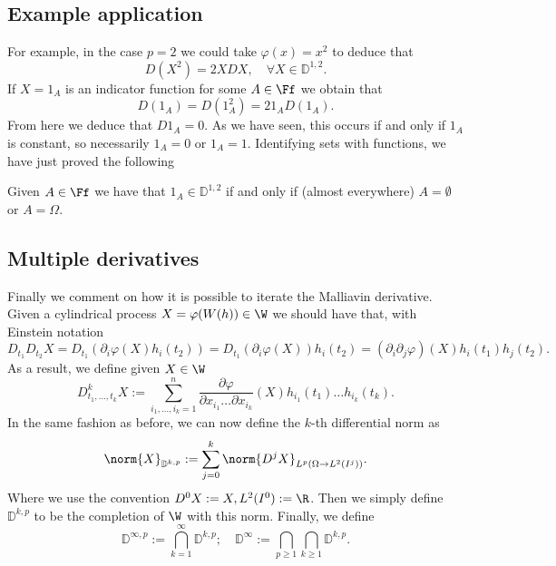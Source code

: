 \documentclass[
    a4paper,
    DIV=14,
    abstract=true,
    numbers=noenddot
]{scrartcl}
\begin{document}
\subsection{Example application}
For example, in the case $p=2$ we could take $\varphi(x)=x^2$ to deduce that
\begin{equation*}
	D(X^2)=2XDX,\quad\forall X\in \mathbb{D}^{1,2}.
\end{equation*}
If $X=1_A$ is an indicator function for some  $A\in \Ff$ we obtain that
\begin{equation*}
	D(1_A)=D(1_A^2)=21_AD(1_A).
\end{equation*}
From here we deduce that $D1_A=0$. As we have seen, this occurs if and only if $1_A$ is constant, so necessarily  $1_A=0$ or  $1_A=1$. Identifying sets with functions, we have just proved the following
\begin{corollary}
	Given $A\in \Ff$ we have that $1_A\in \mathbb{D}^{1,2}$ if and only if (almost everywhere) $A=\emptyset$ or $A=\Omega$.
\end{corollary}


\subsection{Multiple derivatives}
Finally we comment on how it is possible to iterate the Malliavin derivative. Given a cylindrical process $X=\varphi(W(h))\in \W$ we should have that, with Einstein notation
\begin{equation*}
	D_{t_1}D_{t_2}X=D_{t_1}(\partial_i \varphi(X)h_i(t_2))=D_{t_1}(\partial_i \varphi(X))h_i(t_2)=(\partial_i\partial _j \varphi)(X)h_i(t_1)h_j(t_2).
\end{equation*}
As a result, we define given $X\in \W$
\begin{equation*}
	D^k_{t_1,\ldots,t_k} X:= \sum_{i_1,\ldots,i_k=1}^{n}  \frac{\partial \varphi}{\partial x_{i_1}\ldots\partial x_{i_k}}(X)h_{i_1}(t_1)\ldots h_{i_k}(t_k) .
\end{equation*}
In the same fashion as before, we can now define the $k$-th differential norm as
\begin{equation}\label{higher order}
	\norm{X}_{\mathbb{D}^{k,p}}:=\sum_{j=0}^{k}  \norm{D^j X}_{L^p(\Omega\to L^2(I^j))}.
\end{equation}
Where we use the convention $D^0 X:=X, L^2(I^0):= \R$. Then we simply define $\mathbb{D}^{k,p}$ to be the completion of $\W$ with this norm. Finally, we define
\begin{equation*}
	\mathbb{D}^{\infty,p}:= \bigcap_{k=1}^\infty \mathbb{D}^{k,p};\quad \mathbb{D}^\infty := \bigcap_{p \geq 1} \bigcap_{k \geq 1} \mathbb{D}^{k,p}.
\end{equation*}

\end{document}
